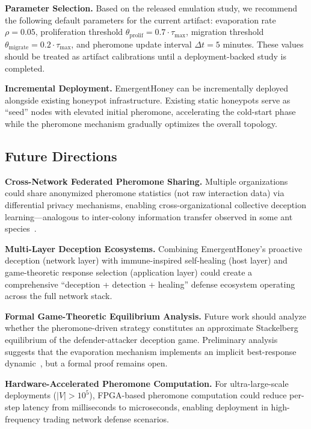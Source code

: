 \documentclass[review,3p,twocolumn]{elsarticle}
\begin{document}
\textbf{Parameter Selection.} Based on the released emulation study, we recommend the following default parameters for the current artifact: evaporation rate $\rho = 0.05$, proliferation threshold $\theta_{\mathrm{prolif}} = 0.7 \cdot \tau_{\max}$, migration threshold $\theta_{\mathrm{migrate}} = 0.2 \cdot \tau_{\max}$, and pheromone update interval $\Delta t = 5$ minutes. These values should be treated as artifact calibrations until a deployment-backed study is completed.

\textbf{Incremental Deployment.} EmergentHoney can be incrementally deployed alongside existing honeypot infrastructure. Existing static honeypots serve as ``seed'' nodes with elevated initial pheromone, accelerating the cold-start phase while the pheromone mechanism gradually optimizes the overall topology.

\subsection{Future Directions}

\textbf{Cross-Network Federated Pheromone Sharing.} Multiple organizations could share anonymized pheromone statistics (not raw interaction data) via differential privacy mechanisms, enabling cross-organizational collective deception learning---analogous to inter-colony information transfer observed in some ant species~\cite{bonabeau1999swarm}.

\textbf{Multi-Layer Deception Ecosystems.} Combining EmergentHoney's proactive deception (network layer) with immune-inspired self-healing (host layer) and game-theoretic response selection (application layer) could create a comprehensive ``deception + detection + healing'' defense ecosystem operating across the full network stack.

\textbf{Formal Game-Theoretic Equilibrium Analysis.} Future work should analyze whether the pheromone-driven strategy constitutes an approximate Stackelberg equilibrium of the defender-attacker deception game. Preliminary analysis suggests that the evaporation mechanism implements an implicit best-response dynamic~\cite{zhu2013game}, but a formal proof remains open.

\textbf{Hardware-Accelerated Pheromone Computation.} For ultra-large-scale deployments ($|V| > 10^5$), FPGA-based pheromone computation could reduce per-step latency from milliseconds to microseconds, enabling deployment in high-frequency trading network defense scenarios.


\end{document}
